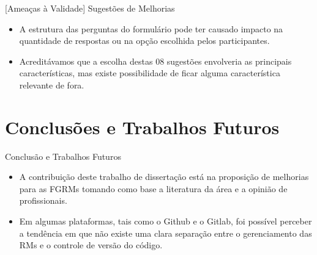\documentclass[t,14pt,mathserif]{beamer}
\begin{document}
\begin{frame}{[Ameaças à Validade] Sugestões de Melhorias}

    \begin{itemize}

        \item A estrutura das perguntas do formulário pode ter causado impacto
            na quantidade de respostas ou na opção escolhida pelos
            participantes.

        \item Acreditávamos que a escolha destas 08 sugestões envolveria as
            principais características, mas existe possibilidade de ficar alguma
            característica relevante de fora.

    \end{itemize}

\end{frame}
\section{Conclusões e Trabalhos Futuros}

\begin{frame}{Conclusão e Trabalhos Futuros}
    \begin{itemize}
        \item A contribuição deste trabalho de dissertação está na proposição de
            melhorias para as FGRMs tomando como base a literatura da área e a
            opinião de profissionais.

        \item Em algumas plataformas, tais como o Github e o Gitlab, foi
              possível perceber a tendência em que não existe uma clara separação
              entre o gerenciamento das RMs e o controle de versão do código.

    \end{itemize}
\end{frame}
\end{document}
